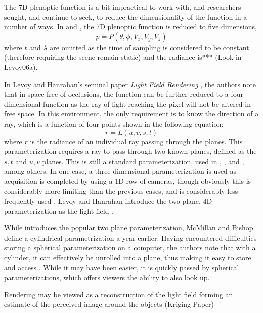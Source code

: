 \documentclass[12pt]{report}
\begin{document}
The 7D plenoptic function is a bit impractical to work with, and researchers sought, and continue to seek, to reduce the dimensionality of the function in a number of ways. In \cite{McMillan95} and \cite{Huang14}, the 7D plenoptic function is reduced to five dimensions,
\begin{equation}
p=P(\theta,\phi,V_x,V_y,V_z)
\end{equation}
where $t$ and $\lambda$ are omitted as the time of sampling is considered to be constant (therefore requiring the scene remain static) and the radiance is*** (Look in Levoy06a). 

In Levoy and Hanrahan's seminal paper \emph{Light Field Rendering} \cite{Levoy96}, the authors note that in space free of occlusions, the function can be further reduced to a four dimensional function as the ray of light reaching the pixel will not be altered in free space. In this environment, the only requirement is to know the direction of a ray, which is a function of four points shown in the following equation:
\begin{equation}
r=L(u,v,s,t)
\end{equation}
where $r$ is the radiance of an individual ray passing through the planes. This parameterization requires a ray to pass through two known planes, defined as the $s,t$ and $u,v$ planes. This is  still a standard parameterization, used in \cite{Isaksen01}, \cite{Vaish06}, and \cite{Oberlin16}, among others. In one case, a three dimensional parameterization is used as acquisition is completed by using a 1D row of cameras, though obviously this is considerably more limiting than the previous cases, and is considerably less frequently used \cite{Kim13}. Levoy and Hanrahan introduce the two plane, 4D parameterization as the light field \cite{Levoy96}.

While \cite{Levoy96} introduces the popular two plane parameterization, McMillan and Bishop define a cylindrical parametrization a year earlier. Having encountered difficulties storing a spherical parameterization on a computer, the authors note that with a cylinder, it can effectively be unrolled into a plane, thus making it easy to store and access \cite{McMillan95}. While it may have been easier, it is quickly passed by spherical parameterizations, which offers viewers the ability to also look up.

Rendering may be viewed as a reconstruction
of the light field forming an estimate of the
perceived image around the objects
(Kriging Paper)
\end{document}

